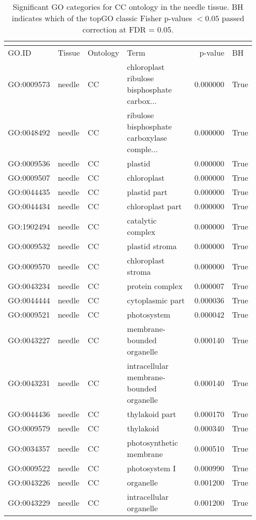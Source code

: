 \begin{longtable}{llllrl}
\caption{Significant GO categories for CC ontology in the needle tissue. BH indicates which of the topGO classic Fisher p-values $< 0.05$ passed correction at FDR = 0.05.}\\
\label{tab:go-needle-CC}\\
\toprule
GO.ID & Tissue & Ontology & Term & p-value & BH \\
\midrule
GO:0009573 & needle & CC &   chloroplast ribulose bisphosphate carbox...  & 0.000000 &   True \\
GO:0048492 & needle & CC &   ribulose bisphosphate carboxylase comple...  & 0.000000 &   True \\
GO:0009536 & needle & CC &   plastid  & 0.000000 &   True \\
GO:0009507 & needle & CC &   chloroplast  & 0.000000 &   True \\
GO:0044435 & needle & CC &   plastid part  & 0.000000 &   True \\
GO:0044434 & needle & CC &   chloroplast part  & 0.000000 &   True \\
GO:1902494 & needle & CC &   catalytic complex  & 0.000000 &   True \\
GO:0009532 & needle & CC &   plastid stroma  & 0.000000 &   True \\
GO:0009570 & needle & CC &   chloroplast stroma  & 0.000000 &   True \\
GO:0043234 & needle & CC &   protein complex  & 0.000007 &   True \\
GO:0044444 & needle & CC &   cytoplasmic part  & 0.000036 &   True \\
GO:0009521 & needle & CC &   photosystem  & 0.000042 &   True \\
GO:0043227 & needle & CC &   membrane-bounded organelle  & 0.000140 &   True \\
GO:0043231 & needle & CC &   intracellular membrane-bounded organelle  & 0.000140 &   True \\
GO:0044436 & needle & CC &   thylakoid part  & 0.000170 &   True \\
GO:0009579 & needle & CC &   thylakoid  & 0.000340 &   True \\
GO:0034357 & needle & CC &   photosynthetic membrane  & 0.000510 &   True \\
GO:0009522 & needle & CC &   photosystem I  & 0.000990 &   True \\
GO:0043226 & needle & CC &   organelle  & 0.001200 &   True \\
GO:0043229 & needle & CC &   intracellular organelle  & 0.001200 &   True \\

\end{longtable}
